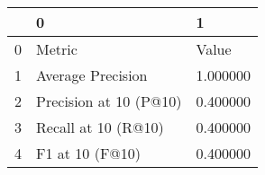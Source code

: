 \begin{tabular}{lll}
\toprule
 & 0 & 1 \\
\midrule
0 & Metric & Value \\
1 & Average Precision & 1.000000 \\
2 & Precision at 10 (P@10) & 0.400000 \\
3 & Recall at 10 (R@10) & 0.400000 \\
4 & F1 at 10 (F@10) & 0.400000 \\
\bottomrule
\end{tabular}
